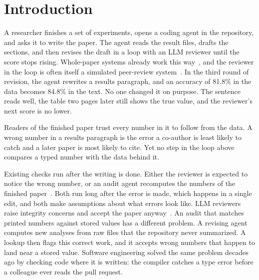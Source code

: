 \section{Introduction}
\label{sec:intro}

A researcher finishes a set of experiments, opens a coding agent in the repository, and asks it to write the paper.
The agent reads the result files, drafts the sections, and then revises the draft in a loop with an LLM reviewer until
the score stops rising. Whole-paper systems already work this
way~\cite{lu2024aiscientist,yamada2025aiscientistv2,song2026paperorchestra,meng2026scientistone}, and the reviewer in
the loop is often itself a simulated peer-review system~\cite{jin2024agentreview,goyal2026scholarpeer}. In the third
round of revision, the agent rewrites a results paragraph, and an accuracy of 81.8\% in the data becomes 84.8\% in
the text. No one changed it on purpose. The sentence reads well, the table two pages later still shows the true
value, and the reviewer's next score is no lower.

Readers of the finished paper trust every number in it to follow from the data. A wrong number in a results paragraph
is the error a co-author is least likely to catch and a later paper is most likely to cite. Yet no step in the loop
above compares a typed number with the data behind it.

Existing checks run after the writing is done. Either the reviewer is expected to notice the wrong number, or an
audit agent recomputes the numbers of the finished
paper~\cite{chen2026fabscore,shen2026reagent,autoresearchclaw2026,meng2026scientistone}. Both run long after the
error is made, which happens in a single edit, and both make assumptions about what errors look like. LLM reviewers
raise integrity concerns and accept the paper anyway~\cite{badscientist2026}. An audit that matches printed numbers
against stored values has a different problem. A revising agent computes new analyses from raw files that the
repository never summarized. A lookup then flags this correct work, and it accepts wrong numbers that happen to land
near a stored value. Software engineering solved the same problem decades ago by checking code where it is written:
the compiler catches a type error before a colleague ever reads the pull request.


